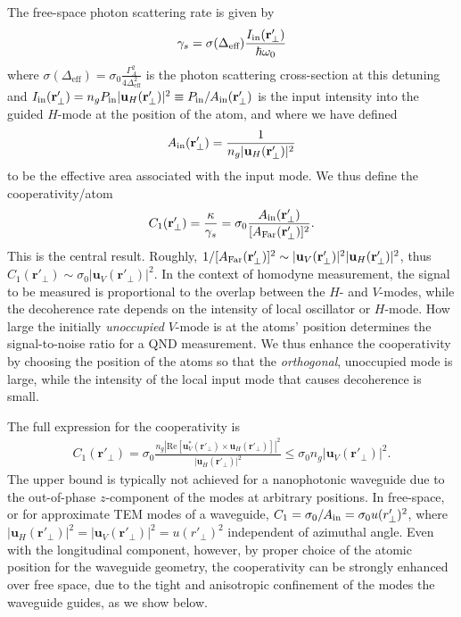 \documentclass[preprint,aps,pra,onecolumn,superscriptaddress]{revtex4-1} %
\newcommand{\mbf}[1]{\mathbf{#1}}
\newcommand{\eff}{\text{eff}}
\newcommand{\AF}{A_{\rm Far}} %
\newcommand{\Ai}{A_{\rm in}} %
\begin{document}
The free-space photon scattering rate is given by
\begin{equation}
\gamma_s = \sigma(\Delta_{\eff}) \frac{I_{\rm in}(\mbf{r}'_\perp)}{\hbar \omega_0}
\end{equation}
where $\sigma(\Delta_{\eff}) = \sigma_0 \frac{\Gamma_A^2}{4 \Delta^2_{\eff}}$ is the photon scattering cross-section at this detuning and  $I_{\rm in}(\mbf{r}'_\perp) = n_g P_{\rm in}\vert \mbf{u}_H (\mbf{r}'_\perp)  \vert^2 \equiv P_{\rm in}/\Ai(\mbf{r}'_\perp) $ is the input intensity into the guided $H$-mode at the position of the atom,  and where we have defined
\begin{equation}
\Ai(\mbf{r}'_\perp) =  \frac{1}{n_g \vert \mbf{u}_H (\mbf{r}'_\perp) \vert ^2}
\end{equation}
to be the effective area associated with the input mode.  We thus define the cooperativity/atom
\begin{equation}
C_1 (\mbf{r}'_\perp)  = \frac{\kappa}{\gamma_s} = \sigma_0 \frac{  \Ai(\mbf{r}'_\perp) }{[\AF(\mbf{r}'_\perp)]^2}.
\end{equation}
This is the central result.  Roughly, $1/[\AF(\mbf{r}'_\perp)]^2 \sim \vert \mbf{u}_V (\mbf{r}'_\perp) \vert ^2 \vert \mbf{u}_H (\mbf{r}'_\perp) \vert ^2$, thus $ C_1(\mbf{r}'_\perp) \sim \sigma_0 \vert \mbf{u}_V (\mbf{r}'_\perp) \vert ^2$. In the context of homodyne measurement, the signal to be measured is proportional to the overlap between the $ H $- and $ V $-modes, while the decoherence rate depends on the intensity of local oscillator or $ H $-mode. How large the initially {\em unoccupied} $ V $-mode is at the atoms' position determines the signal-to-noise ratio for a QND measurement.  We thus enhance the cooperativity by choosing the position of the atoms so that the {\em orthogonal}, unoccupied mode is large, while the intensity of the local input mode that causes decoherence is small.

The full expression for the cooperativity is
\begin{align}\label{eq:c1_bound}
C_1(\mbf{r}'_\perp) = \sigma_0\frac{n_g \left\vert \text{Re} \left[ \mbf{u}^*_V (\mbf{r}'_\perp) \times \mbf{u}_H (\mbf{r}'_\perp) \right]\right\vert^2}{\vert \mbf{u}_H (\mbf{r}'_\perp) \vert ^2} \le \sigma_0n_g \vert \mbf{u}_V (\mbf{r}'_\perp) \vert ^2.
\end{align}
The upper bound is typically not achieved for a nanophotonic waveguide due to the out-of-phase $z $-component of the modes at arbitrary positions.  In free-space, or for approximate TEM modes of a waveguide, $ C_1=\sigma_0/\Ai=\sigma_0 u(r'_\perp)^2$, where $ \vert \mbf{u}_H (\mbf{r}'_\perp) \vert ^2=\vert \mbf{u}_V (\mbf{r}'_\perp) \vert ^2 = u(r'_\perp)^2 $ independent of azimuthal angle. 
Even with the longitudinal component, however, by proper choice of the atomic position for the waveguide geometry, the cooperativity can be strongly enhanced over free space, due to the tight and anisotropic confinement of the modes the waveguide guides,  as we  show below.
\end{document}
